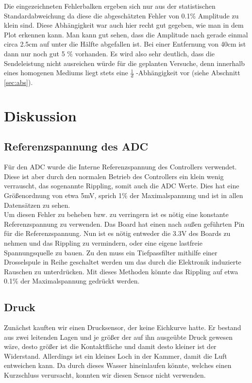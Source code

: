 \documentclass[12pt,a4paper,titlepage,headinclude,bibtotoc]{scrartcl}
\numberwithin{equation}{subsection}
\begin{document}
Die eingezeichneten Fehlerbalken ergeben sich nur aus der statistischen Standardabweichung da diese die abgeschätzten Fehler von 0.1\% Amplitude zu klein sind. Diese Abhängigkeit war auch hier recht gut gegeben, wie man in dem Plot erkennen kann. 
Man kann gut sehen, dass die Amplitude nach gerade einmal circa 2.5\si{\centi\meter} auf unter die Hälfte abgefallen ist. Bei einer Entfernung von 40\si{\centi\meter} ist dann nur noch gut 5 $\%$ vorhanden. Es wird also sehr deutlich, dass die Sendeleistung nicht ausreichen würde für die geplanten Versuche, denn innerhalb eines homogenen Mediums liegt stets eine $\frac{1}{d}$ -Abhängigkeit vor (siehe Abschnitt \ref{sec:abs}). 


\section{Diskussion}
\label{sec:diskussion}

\subsection{Referenzspannung des ADC}
\label{sec:diskreffADC}
Für den ADC wurde die Interne Referenzspannung des Controllers verwendet.
Diese ist aber durch den normalen Betrieb des Controllers ein klein wenig verrauscht, das sogenannte Rippling, somit auch die ADC Werte.
Dies hat eine Größenordnung von etwa 5\si{\milli\volt}, sprich 1\% der Maximalspannung und ist in allen Datensätzen zu sehen.\\
Um diesen Fehler zu beheben bzw. zu verringern ist es nötig eine konstante Referenzspannung zu verwenden.
Das Board hat einen nach außen geführten Pin für die Referenzspannung.
Nun ist es nötig entweder die 3.3\si{\volt} des Boards zu nehmen und das Rippling zu vermindern, oder eine eigene lastfreie Spannungsquelle zu bauen.
Zu den muss ein Tiefpassfilter mithilfe einer Drosselspule in Reihe geschaltet werden um das durch die Elektronik induzierte Rauschen zu unterdrücken.
Mit dieses Methoden könnte das Rippling auf etwa 0.1\% der Maximalspannung gedrückt werden.

\subsection{Druck}
Zunächst kauften wir einen Drucksensor, der keine Eichkurve hatte.
Er bestand aus zwei leitenden Lagen und je größer der auf ihn ausgeübte Druck gewesen wäre, desto größer ist die Kontaktfläche und damit desto kleiner ist der Widerstand.
Allerdings ist ein kleines Loch in der Kammer, damit die Luft entweichen kann.
Da durch dieses Wasser hineinlaufen könnte, welches einen Kurzschluss verursacht, konnten wir diesen Sensor nicht verwenden.
\end{document}

